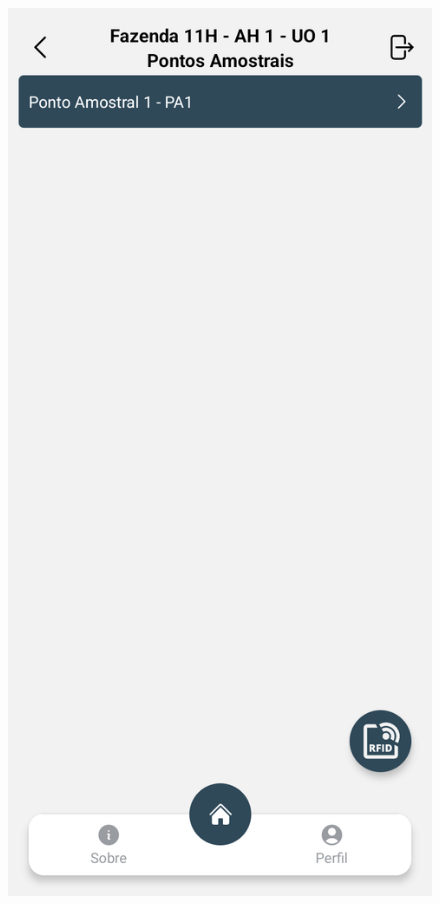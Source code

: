 \begin{figure}[H]
\begin{minipage}[b]{0.30\textwidth}
    \end{minipage}
    \hspace{3pt}
    \begin{minipage}[b]{0.30\textwidth}
        \centering
        \includegraphics[width=\textwidth]{images/app/08-sampling-points.png}

\end{minipage}
\end{figure}
